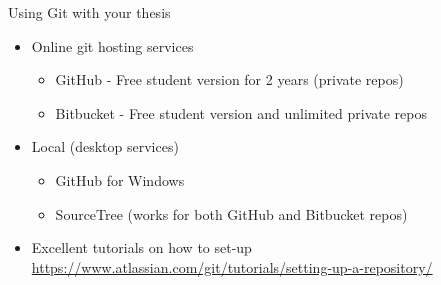 \documentclass[10pt,times]{beamer}
\begin{document}
\begin{frame}{Using Git with your thesis}
\begin{itemize}
\item Online git hosting services
\begin{itemize}
\item GitHub - Free student version for 2 years (private repos)
\item Bitbucket - Free student version and unlimited private repos
\end{itemize}
\item Local (desktop services)
\begin{itemize}
\item GitHub for Windows
\item SourceTree (works for both GitHub and Bitbucket repos) 
\end{itemize}
\item Excellent tutorials on how to set-up 
\href{https://www.atlassian.com/git/tutorials/setting-up-a-repository/}
{https://www.atlassian.com/git/tutorials/setting-up-a-repository/}
\end{itemize}
\end{frame}
\end{document}
